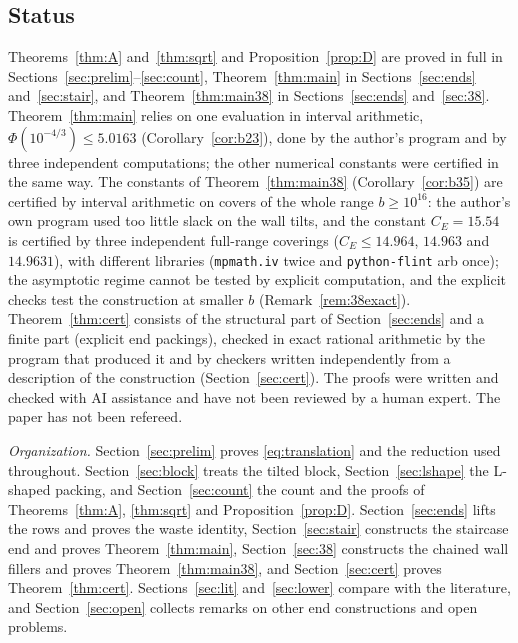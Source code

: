 \documentclass[11pt]{amsart}
\theoremstyle{definition}
\theoremstyle{remark}
\numberwithin{equation}{section}
\begin{document}
\subsection{Status}\label{ssec:status}
Theorems~\ref{thm:A} and~\ref{thm:sqrt} and Proposition~\ref{prop:D} are proved in full in
Sections~\ref{sec:prelim}--\ref{sec:count}, Theorem~\ref{thm:main} in Sections~\ref{sec:ends}
and~\ref{sec:stair}, and Theorem~\ref{thm:main38} in Sections~\ref{sec:ends} and~\ref{sec:38}.
Theorem~\ref{thm:main} relies on one evaluation in interval arithmetic,
$\Phi(10^{-4/3})\le5.0163$ (Corollary~\ref{cor:b23}), done by the author's program and by three independent
computations; the other numerical constants were certified in the same way. The constants of
Theorem~\ref{thm:main38} (Corollary~\ref{cor:b35}) are certified by interval arithmetic on covers of the whole range
$b\ge10^{16}$: the author's own program used too little slack on the wall tilts, and the constant $C_E=15.54$ is
certified by three independent full-range coverings ($C_E\le14.964$, $14.963$ and $14.9631$), with different libraries
(\texttt{mpmath.iv} twice and \texttt{python-flint} arb once); the asymptotic regime cannot be tested by
explicit computation, and the explicit checks test the construction at smaller $b$ (Remark~\ref{rem:38exact}).
Theorem~\ref{thm:cert} consists of the structural part of Section~\ref{sec:ends} and a finite part (explicit end
packings), checked in exact rational arithmetic by the program that produced it and by checkers written independently
from a description of the construction (Section~\ref{sec:cert}). The proofs were written and checked with AI
assistance and have not been reviewed by a human expert. The paper has not been refereed.

\emph{Organization.} Section~\ref{sec:prelim} proves \eqref{eq:translation} and the reduction used throughout.
Section~\ref{sec:block} treats the tilted block, Section~\ref{sec:lshape} the L-shaped packing, and
Section~\ref{sec:count} the count and the proofs of Theorems~\ref{thm:A}, \ref{thm:sqrt} and Proposition~\ref{prop:D}.
Section~\ref{sec:ends} lifts the rows and proves the waste identity, Section~\ref{sec:stair} constructs the staircase
end and proves Theorem~\ref{thm:main}, Section~\ref{sec:38} constructs the chained wall fillers and proves
Theorem~\ref{thm:main38}, and Section~\ref{sec:cert} proves Theorem~\ref{thm:cert}.
Sections~\ref{sec:lit} and~\ref{sec:lower} compare with the literature, and Section~\ref{sec:open} collects remarks on
other end constructions and open problems.
\end{document}
